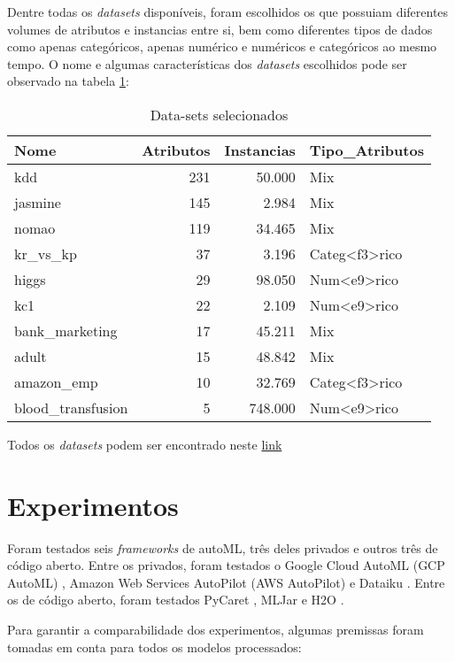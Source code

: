 \documentclass[9pt, a4paper, twocolumn]{article}
\begin{document}
Dentre todas os \emph{datasets} disponíveis, foram escolhidos os que possuiam diferentes volumes de atributos e instancias entre si, bem como diferentes tipos de dados como apenas categóricos, apenas numérico e numéricos e categóricos ao mesmo tempo. O nome e algumas características dos \emph{datasets} escolhidos pode ser observado na tabela \ref{tab:tabledatasets}:

\begin{table}[!h]

\caption{\label{tab:tabledatasets}Data-sets selecionados}
\centering
\fontsize{8.5}{10.5}\selectfont
\begin{tabular}[t]{lrrl}
\toprule
Nome & Atributos & Instancias & Tipo\_Atributos\\
\midrule
kdd & 231 & 50.000 & Mix\\
jasmine & 145 & 2.984 & Mix\\
nomao & 119 & 34.465 & Mix\\
kr\_vs\_kp & 37 & 3.196 & Categ<f3>rico\\
higgs & 29 & 98.050 & Num<e9>rico\\
\addlinespace
kc1 & 22 & 2.109 & Num<e9>rico\\
bank\_marketing & 17 & 45.211 & Mix\\
adult & 15 & 48.842 & Mix\\
amazon\_emp & 10 & 32.769 & Categ<f3>rico\\
blood\_transfusion & 5 & 748.000 & Num<e9>rico\\
\bottomrule
\end{tabular}
\end{table}

Todos os \textit{datasets} podem ser encontrado neste \href{https://www.openml.org/search?type=data\&sort=runs\&status=active}{link}

\hypertarget{experimentos}{%
\section{Experimentos}\label{experimentos}}

Foram testados seis \emph{frameworks} de autoML, três deles privados e outros três de código aberto. Entre os privados, foram testados o Google Cloud AutoML (GCP AutoML) \cite{GCPAutoML}, Amazon Web Services AutoPilot (AWS AutoPilot) \cite{AWSAutopilot} e Dataiku \cite{Dataiku}. Entre os de código aberto, foram testados PyCaret \cite{PyCaret}, MLJar \cite{mljar} e H2O \cite{H2OAutoML20}.

Para garantir a comparabilidade dos experimentos, algumas premissas foram tomadas em conta para todos os modelos processados:
\end{document}
